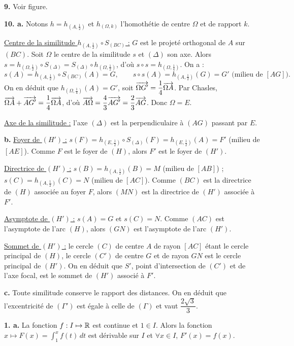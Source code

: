 \documentclass[11pt]{article}
\begin{document}
\textbf{9.} Voir figure.

\textbf{10. a.} Notons $h = h_{(A,\frac{1}{2})}$ et $h_{(\Omega,k)}$ l'homothétie de centre $\Omega$ et de rapport $k$.

\underline{Centre de la similitude $h_{(A,\frac{1}{2})} \circ S_{(BC)}$ :} $G$ est le projeté orthogonal de $A$ sur $(BC)$. Soit $\Omega$ le centre de la similitude $s$ et $(\Delta)$ son axe. Alors $s = h_{(\Omega,\frac{1}{2})} \circ S_{(\Delta)} = S_{(\Delta)} \circ h_{(\Omega,\frac{1}{2})}$, d'où $s \circ s = h_{(\Omega,\frac{1}{4})}$. On a :
\[ s(A) = h_{(A,\frac{1}{2})} \circ S_{(BC)}(A) = G, \qquad s \circ s(A) = h_{(A,\frac{1}{2})}(G) = G' \text{ (milieu de }[AG]). \]
On en déduit que $h_{(\Omega,\frac{1}{4})}(A) = G'$, soit $\overrightarrow{\Omega G'} = \dfrac{1}{4}\overrightarrow{\Omega A}$. Par Chasles, $\overrightarrow{\Omega A} + \overrightarrow{AG'} = \dfrac{1}{4}\overrightarrow{\Omega A}$, d'où $\overrightarrow{A\Omega} = \dfrac{4}{3}\overrightarrow{AG'} = \dfrac{2}{3}\overrightarrow{AG}$. Donc $\Omega = E$.

\underline{Axe de la similitude :} l'axe $(\Delta)$ est la perpendiculaire à $(AG)$ passant par $E$.

\textbf{b.} \underline{Foyer de $(H')$ :} $s(F) = h_{(E,\frac{1}{2})} \circ S_{(\Delta)}(F) = h_{(E,\frac{1}{2})}(A) = F'$ (milieu de $[AE]$). Comme $F$ est le foyer de $(H)$, alors $F'$ est le foyer de $(H')$.

\underline{Directrice de $(H')$ :} $s(B) = h_{(A,\frac{1}{2})}(B) = M$ (milieu de $[AB]$) ; $s(C) = h_{(A,\frac{1}{2})}(C) = N$ (milieu de $[AC]$). Comme $(BC)$ est la directrice de $(H)$ associée au foyer $F$, alors $(MN)$ est la directrice de $(H')$ associée à $F'$.

\underline{Asymptote de $(H')$ :} $s(A) = G$ et $s(C) = N$. Comme $(AC)$ est l'asymptote de l'arc $(H)$, alors $(GN)$ est l'asymptote de l'arc $(H')$.

\underline{Sommet de $(H')$ :} le cercle $(C)$ de centre $A$ de rayon $[AC]$ étant le cercle principal de $(H)$, le cercle $(C')$ de centre $G$ et de rayon $GN$ est le cercle principal de $(H')$. On en déduit que $S'$, point d'intersection de $(C')$ et de l'axe focal, est le sommet de $(H')$ associé à $F'$.

\textbf{c.} Toute similitude conserve le rapport des distances. On en déduit que l'excentricité de $(\Gamma')$ est égale à celle de $(\Gamma)$ et vaut $\dfrac{2\sqrt{3}}{3}$.


\textbf{1. a.} La fonction $f : I \mapsto \mathbb{R}$ est continue et $1 \in I$. Alors la fonction $x \mapsto F(x) = \displaystyle\int_1^x f(t)\,dt$ est dérivable sur $I$ et $\forall x \in I$, $F'(x) = f(x)$.
\end{document}
